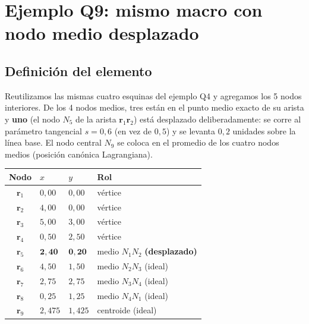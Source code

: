 \documentclass[11pt,a4paper]{article}
\begin{document}
\newpage
\section{Ejemplo Q9: mismo macro con nodo medio desplazado}
\label{sec:q9}

\subsection{Definici\'on del elemento}
Reutilizamos las mismas cuatro esquinas del ejemplo Q4 y agregamos los 5 nodos interiores. De los 4 nodos medios, tres est\'an en el punto medio exacto de su arista y \textbf{uno} (el nodo $N_5$ de la arista $\mathbf{r}_1\mathbf{r}_2$) est\'a desplazado deliberadamente: se corre al par\'ametro tangencial $s=0{,}6$ (en vez de $0{,}5$) y se levanta $0{,}2$ unidades sobre la l\'inea base. El nodo central $N_9$ se coloca en el promedio de los cuatro nodos medios (posici\'on can\'onica Lagrangiana).

\begin{center}
\renewcommand{\arraystretch}{1.15}
\begin{tabular}{clll}
\toprule
Nodo & $x$ & $y$ & Rol \\
\midrule
$\mathbf{r}_1$ & $0{,}00$ & $0{,}00$ & v\'ertice \\
$\mathbf{r}_2$ & $4{,}00$ & $0{,}00$ & v\'ertice \\
$\mathbf{r}_3$ & $5{,}00$ & $3{,}00$ & v\'ertice \\
$\mathbf{r}_4$ & $0{,}50$ & $2{,}50$ & v\'ertice \\
$\mathbf{r}_5$ & $\mathbf{2{,}40}$ & $\mathbf{0{,}20}$ & medio $N_1N_2$ \textbf{(desplazado)} \\
$\mathbf{r}_6$ & $4{,}50$ & $1{,}50$ & medio $N_2N_3$ (ideal) \\
$\mathbf{r}_7$ & $2{,}75$ & $2{,}75$ & medio $N_3N_4$ (ideal) \\
$\mathbf{r}_8$ & $0{,}25$ & $1{,}25$ & medio $N_4N_1$ (ideal) \\
$\mathbf{r}_9$ & $2{,}475$ & $1{,}425$ & centroide (ideal) \\
\bottomrule
\end{tabular}
\end{center}
\end{document}
